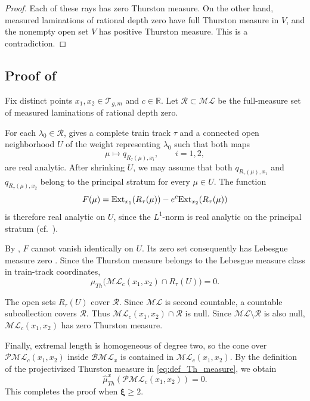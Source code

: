 \documentclass[dvipdfmx]{amsart}
\theoremstyle{remark}
\newcommand{\ext}{{\rm Ext}}
\newcommand{\teich}{\mathcal{T}}
\newcommand{\ThursM}{\mu_{Th}}
\newcommand{\PThursM}{\hat{\mu}_{Th}}
\newcommand{\convgenus}{{\boldsymbol \xi}}
\newcommand{\ml}{\mathcal{ML}}
\newcommand{\pml}{\mathcal{PML}}
\begin{document}
\begin{proof}
Each of these rays has zero Thurston measure.
On the other hand, measured laminations of rational
depth zero have full Thurston measure in $V$, and the
nonempty open set $V$ has positive Thurston measure.
This is a contradiction.
\end{proof}

\subsection{Proof of }
Fix distinct points $x_1,x_2\in\teich_{g,m}$ and
$c\in\mathbb R$.
Let $\mathcal R\subset\ml$ be the full-measure set
of measured laminations of rational depth zero.

For each $\lambda_0\in\mathcal R$,
 gives a complete train
track $\tau$ and a connected open neighborhood $U$
of the weight representing $\lambda_0$ such that
both maps
\[
\mu\longmapsto q_{R_\tau(\mu),x_i},
\qquad i=1,2,
\]
are real analytic.
After shrinking $U$, we may assume that both
$q_{R_\tau(\mu),x_1}$ and $q_{R_\tau(\mu),x_2}$
belong to the principal stratum for every $\mu\in U$.
The function
\[
F(\mu)
=
\ext_{x_1}(R_\tau(\mu))
-e^c\ext_{x_2}(R_\tau(\mu))
\]
is therefore real analytic on $U$, since the
$L^1$-norm is real analytic on the principal stratum
(cf.\ \cite[\S\S5.3--5.4]{Dumas2015}).

By , $F$ cannot vanish
identically on $U$.
Its zero set consequently has Lebesgue measure
zero \cite{Mityagin2020}.
Since the Thurston measure belongs to the Lebesgue
measure class in train-track coordinates,
\[
\ThursM\bigl(
\ml_c(x_1,x_2)\cap R_\tau(U)
\bigr)=0.
\]

The open sets $R_\tau(U)$ cover $\mathcal R$.
Since $\ml$ is second countable, a countable
subcollection covers $\mathcal R$.
Thus $\ml_c(x_1,x_2)\cap\mathcal R$ is null.
Since $\ml\setminus\mathcal R$ is also null,
$\ml_c(x_1,x_2)$ has zero Thurston measure.

Finally, extremal length is homogeneous of degree
two, so the cone over $\pml_c(x_1,x_2)$ inside
$\mathcal{BML}_x$ is contained in $\ml_c(x_1,x_2)$.
By the definition of the projectivized Thurston
measure in \eqref{eq:def_Th_measure}, we obtain
\[
\PThursM^x(\pml_c(x_1,x_2))=0.
\]
This completes the proof when $\convgenus\ge2$.
\end{document}
